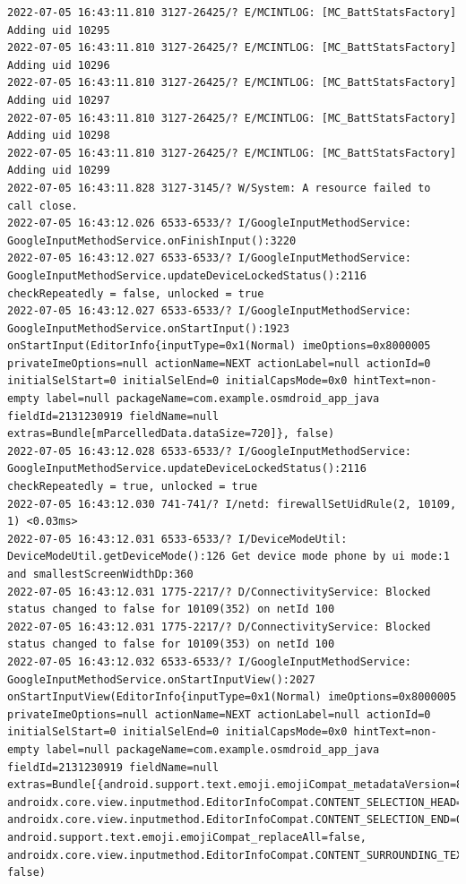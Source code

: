 \documentclass[a4paper,12pt]{book}
\begin{document}
\begin{lstlisting}
2022-07-05 16:43:11.810 3127-26425/? E/MCINTLOG: [MC_BattStatsFactory] Adding uid 10295
2022-07-05 16:43:11.810 3127-26425/? E/MCINTLOG: [MC_BattStatsFactory] Adding uid 10296
2022-07-05 16:43:11.810 3127-26425/? E/MCINTLOG: [MC_BattStatsFactory] Adding uid 10297
2022-07-05 16:43:11.810 3127-26425/? E/MCINTLOG: [MC_BattStatsFactory] Adding uid 10298
2022-07-05 16:43:11.810 3127-26425/? E/MCINTLOG: [MC_BattStatsFactory] Adding uid 10299
2022-07-05 16:43:11.828 3127-3145/? W/System: A resource failed to call close. 
2022-07-05 16:43:12.026 6533-6533/? I/GoogleInputMethodService: GoogleInputMethodService.onFinishInput():3220 
2022-07-05 16:43:12.027 6533-6533/? I/GoogleInputMethodService: GoogleInputMethodService.updateDeviceLockedStatus():2116 checkRepeatedly = false, unlocked = true
2022-07-05 16:43:12.027 6533-6533/? I/GoogleInputMethodService: GoogleInputMethodService.onStartInput():1923 onStartInput(EditorInfo{inputType=0x1(Normal) imeOptions=0x8000005 privateImeOptions=null actionName=NEXT actionLabel=null actionId=0 initialSelStart=0 initialSelEnd=0 initialCapsMode=0x0 hintText=non-empty label=null packageName=com.example.osmdroid_app_java fieldId=2131230919 fieldName=null extras=Bundle[mParcelledData.dataSize=720]}, false)
2022-07-05 16:43:12.028 6533-6533/? I/GoogleInputMethodService: GoogleInputMethodService.updateDeviceLockedStatus():2116 checkRepeatedly = true, unlocked = true
2022-07-05 16:43:12.030 741-741/? I/netd: firewallSetUidRule(2, 10109, 1) <0.03ms>
2022-07-05 16:43:12.031 6533-6533/? I/DeviceModeUtil: DeviceModeUtil.getDeviceMode():126 Get device mode phone by ui mode:1 and smallestScreenWidthDp:360
2022-07-05 16:43:12.031 1775-2217/? D/ConnectivityService: Blocked status changed to false for 10109(352) on netId 100
2022-07-05 16:43:12.031 1775-2217/? D/ConnectivityService: Blocked status changed to false for 10109(353) on netId 100
2022-07-05 16:43:12.032 6533-6533/? I/GoogleInputMethodService: GoogleInputMethodService.onStartInputView():2027 onStartInputView(EditorInfo{inputType=0x1(Normal) imeOptions=0x8000005 privateImeOptions=null actionName=NEXT actionLabel=null actionId=0 initialSelStart=0 initialSelEnd=0 initialCapsMode=0x0 hintText=non-empty label=null packageName=com.example.osmdroid_app_java fieldId=2131230919 fieldName=null extras=Bundle[{android.support.text.emoji.emojiCompat_metadataVersion=8, androidx.core.view.inputmethod.EditorInfoCompat.CONTENT_SELECTION_HEAD=0, androidx.core.view.inputmethod.EditorInfoCompat.CONTENT_SELECTION_END=0, android.support.text.emoji.emojiCompat_replaceAll=false, androidx.core.view.inputmethod.EditorInfoCompat.CONTENT_SURROUNDING_TEXT=}]}, false)

\end{lstlisting}
\end{document}
